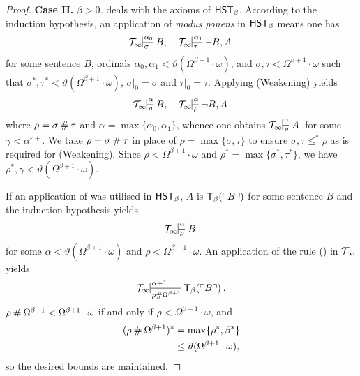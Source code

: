 \documentclass[UKenglish,cleveref,DIV=12]{scrartcl}
\theoremstyle{definition}
\theoremstyle{definition}
\begin{document}
\begin{proof}
\noindent\textbf{Case II.} \textit{${\beta>0}$.}
 deals with the axioms of $\mathsf{HST}_\beta$. According to the
induction hypothesis, an application of {\em modus ponens} in $\mathsf{HST}_\beta$ means one has
\begin{align*}%
 \Tinfty\prov{\alpha_0}{\sigma}{B,}&&   \Tinfty\prov{\alpha_1}{\tau}{\lnot B,A}
\end{align*}
for some sentence $B$, ordinals
$\alpha_0,\alpha_1<\vartheta(\Omega^{\beta+1}\cdot\omega)$, and
$\sigma,\tau<\Omega^{\beta+1}\cdot\omega$ such that
$\sigma^*,\tau^*<\vartheta(\Omega^{\beta+1}\cdot\omega)$, $\sigma|_0=\sigma$ and $\tau|_0=\tau$. Applying (Weakening)
yields
\begin{align*}%
 \Tinfty\prov{\alpha}{\rho}{B,}& &\Tinfty\prov{\alpha}{\rho}{\lnot B,A}
\end{align*}
where $\rho=\sigma\mathbin{\#}\tau$ and $\alpha=\max\{\alpha_0,\alpha_1\}$, whence one obtains
$\Tinfty\prov\gamma\rho A$ for some $\gamma<\alpha^{\varepsilon+}$. We
take $\rho=\sigma\mathbin{\#}\tau$ in place of $\rho=\max\{\sigma,\tau\}$ to ensure
$\sigma,\tau\le^* \rho$ as is required for (Weakening). Since
$\rho<\Omega^{\beta+1}\cdot\omega$ and  $\rho^*=\max\{\sigma^*,\tau^*\}$, we have
$\rho^*,\gamma<\vartheta(\Omega^{\beta+1}\cdot\omega)$.

If an application of \Nec\beta was utilised in $\mathsf{HST}_\beta$, $A$ is $\mathsf{T}_\beta(\ulcorner{B}\urcorner)$ for some sentence $B$ and the induction hypothesis yields
\begin{align*}
 \Tinfty\prov\alpha\rho B
\end{align*}
for some $\alpha<\vartheta(\Omega^{\beta+1}\cdot\omega)$ and
$\rho<\Omega^{\beta+1}\cdot\omega$. An application of the rule (\Nec\beta)
in $\mathcal{T}_\infty$ yields
\begin{align*}
  \Tinfty\prov{\alpha+1}{\rho\nsum\Omega^{\beta+1}} {\T_\beta(\gn B)}.
\end{align*}
$\rho\mathbin{\#}\Omega^{\beta+1}<\Omega^{\beta+1}\cdot\omega$ if and only if
$\rho<\Omega^{\beta+1}\cdot\omega$, and
\begin{align*}
  (\rho\mathbin{\#}\Omega^{\beta+1})^*&=\max\{\rho^*,\beta^*\}\\
	&\le\vartheta(\Omega^{\beta+1}\cdot\omega),
\end{align*}
so the desired bounds are maintained.


\end{proof}
\end{document}
